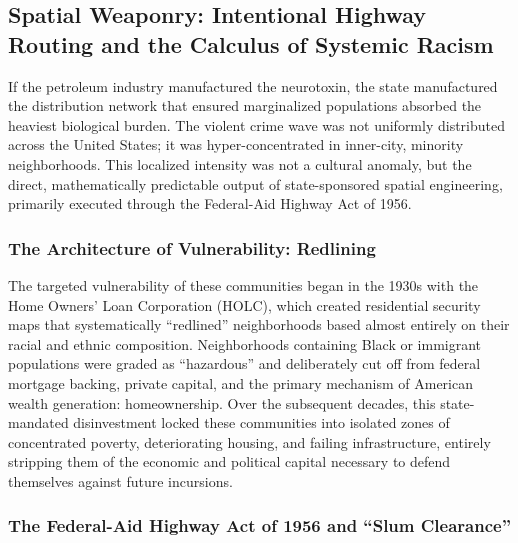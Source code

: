 \documentclass[
]{article}
\begin{document}
\subsection{\texorpdfstring{\textbf{Spatial Weaponry: Intentional
Highway Routing and the Calculus of Systemic
Racism}}{Spatial Weaponry: Intentional Highway Routing and the Calculus of Systemic Racism}}\label{spatial-weaponry-intentional-highway-routing-and-the-calculus-of-systemic-racism}

If the petroleum industry manufactured the neurotoxin, the state
manufactured the distribution network that ensured marginalized
populations absorbed the heaviest biological burden. The violent crime
wave was not uniformly distributed across the United States; it was
hyper-concentrated in inner-city, minority neighborhoods. This localized
intensity was not a cultural anomaly, but the direct, mathematically
predictable output of state-sponsored spatial engineering, primarily
executed through the Federal-Aid Highway Act of 1956.

\subsubsection{\texorpdfstring{\textbf{The Architecture of
Vulnerability:
Redlining}}{The Architecture of Vulnerability: Redlining}}\label{the-architecture-of-vulnerability-redlining}

The targeted vulnerability of these communities began in the 1930s with
the Home Owners' Loan Corporation (HOLC), which created residential
security maps that systematically ``redlined'' neighborhoods based
almost entirely on their racial and ethnic composition. Neighborhoods
containing Black or immigrant populations were graded as ``hazardous''
and deliberately cut off from federal mortgage backing, private capital,
and the primary mechanism of American wealth generation: homeownership.
Over the subsequent decades, this state-mandated disinvestment locked
these communities into isolated zones of concentrated poverty,
deteriorating housing, and failing infrastructure, entirely stripping
them of the economic and political capital necessary to defend
themselves against future incursions.

\subsubsection{\texorpdfstring{\textbf{The Federal-Aid Highway Act of
1956 and ``Slum
Clearance''}}{The Federal-Aid Highway Act of 1956 and ``Slum Clearance''}}\label{the-federal-aid-highway-act-of-1956-and-slum-clearance}
\end{document}
